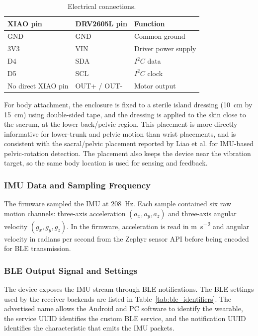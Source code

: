 \begin{table}[!htbp]
    \centering
    \footnotesize
    \caption{Electrical connections.}
    \label{tab:electrical_connections}
    \begin{tabular*}{\linewidth}{@{\extracolsep{\fill}}lll@{}}
        \toprule
        XIAO pin & DRV2605L pin & Function \\
        \midrule
        GND & GND & Common ground \\
        3V3 & VIN & Driver power supply \\
        D4 & SDA & \(I^2C\) data \\
        D5 & SCL & \(I^2C\) clock \\
        No direct XIAO pin & OUT+ / OUT- & Motor output \\
        \bottomrule
    \end{tabular*}
\end{table}

For body attachment, the enclosure is fixed to a sterile island dressing (10~cm by 15~cm) using double-sided tape, and the dressing is applied to the skin close to the sacrum, at the lower-back/pelvic region. This placement is more directly informative for lower-trunk and pelvic motion than wrist placements, and is consistent with the sacral/pelvic placement reported by Liao et al. for IMU-based pelvic-rotation detection. The placement also keeps the device near the vibration target, so the same body location is used for sensing and feedback.

\subsubsection{IMU Data and Sampling Frequency}

The firmware sampled the IMU at 208~Hz. Each sample contained six raw motion channels: three-axis acceleration \((a_x, a_y, a_z)\) and three-axis angular velocity \((g_x, g_y, g_z)\). In the firmware, acceleration is read in \si{\meter\per\second\squared} and angular velocity in radians per second from the Zephyr sensor API before being encoded for BLE transmission.

\subsubsection{BLE Output Signal and Settings}

The device exposes the IMU stream through BLE notifications. The BLE settings used by the receiver backends are listed in Table~\ref{tab:ble_identifiers}. The advertised name allows the Android and PC software to identify the wearable, the service UUID identifies the custom BLE service, and the notification UUID identifies the characteristic that emits the IMU packets.

